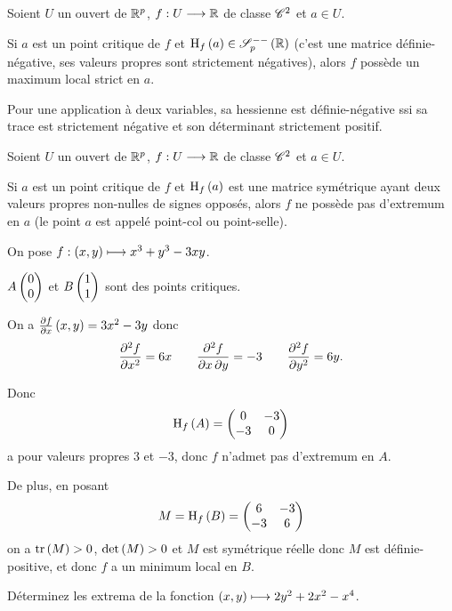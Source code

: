 \begin{prop}
Soient \(U\) un ouvert de \(\mathbb{R}^p\), \(f:U\longrightarrow\mathbb{R}\) de classe \(\mathscr{C}^{2}\) et \(a\in U\).

Si \(a\) est un point critique de \(f\) et \(\hessienne{f}\paren{a}\in\symdefneg{p}[\R]\) (\ie c'est une matrice définie-négative, ses valeurs propres sont strictement négatives), alors \(f\) possède un maximum local strict en \(a\).
\end{prop}

Pour une application à deux variables, sa hessienne est définie-négative ssi sa trace est strictement négative et son déterminant strictement positif.

\begin{prop}
Soient \(U\) un ouvert de \(\mathbb{R}^p\), \(f:U\longrightarrow\mathbb{R}\) de classe \(\mathscr{C}^{2}\) et \(a\in U\).

Si \(a\) est un point critique de \(f\) et \(\operatorname{H}_{f}\left(a\right)\) est une matrice symétrique ayant deux valeurs propres non-nulles de signes opposés, alors \(f\) ne possède pas d'extremum en \(a\) (le point \(a\) est appelé point-col ou point-selle).
\end{prop}

\begin{corr}
On pose \(f:\left(x,y\right)\longmapsto x^3+y^3-3xy\).

\(A\begin{pmatrix}0\\0\end{pmatrix}\) et \(B\begin{pmatrix}1\\1\end{pmatrix}\) sont des points critiques.

On a \(\pdv{f}{x}\left(x,y\right)=3x^2-3y\) donc \[\pdv[order=2]{f}{x}=6x\qquad\pdv{f}{x,y}=-3\qquad\pdv[order=2]{f}{y}=6y.\]

Donc \[\operatorname{H}_{f}\left(A\right)=\begin{pmatrix}
0 & -3 \\
-3 & 0
\end{pmatrix}\] a pour valeurs propres \(3\) et \(-3\), donc \(f\) n'admet pas d'extremum en \(A\).

De plus, en posant \[M=\operatorname{H}_{f}\left(B\right)=\begin{pmatrix}
6 & -3 \\
-3 & 6
\end{pmatrix}\] on a \(\operatorname{tr}\left(M\right)>0\), \(\det\left(M\right)>0\) et \(M\) est symétrique réelle donc \(M\) est définie-positive, et donc \(f\) a un minimum local en \(B\).
\end{corr}

\begin{exo}
Déterminez les extrema de la fonction \(\left(x,y\right)\longmapsto2y^2+2x^2-x^4\).
\end{exo}

